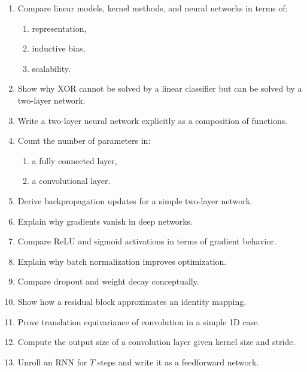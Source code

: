 \begin{enumerate}
    \item Compare linear models, kernel methods, and neural networks in terms of:
    \begin{enumerate}
        \item representation,
        \item inductive bias,
        \item scalability.
    \end{enumerate}

    \item Show why XOR cannot be solved by a linear classifier but can be solved by a two-layer network.

    \item Write a two-layer neural network explicitly as a composition of functions.

    \item Count the number of parameters in:
    \begin{enumerate}
        \item a fully connected layer,
        \item a convolutional layer.
    \end{enumerate}

    \item Derive backpropagation updates for a simple two-layer network.

    \item Explain why gradients vanish in deep networks.

    \item Compare ReLU and sigmoid activations in terms of gradient behavior.

    \item Explain why batch normalization improves optimization.

    \item Compare dropout and weight decay conceptually.

    \item Show how a residual block approximates an identity mapping.

    \item Prove translation equivariance of convolution in a simple 1D case.

    \item Compute the output size of a convolution layer given kernel size and stride.

    \item Unroll an RNN for $T$ steps and write it as a feedforward network.


\end{enumerate}
